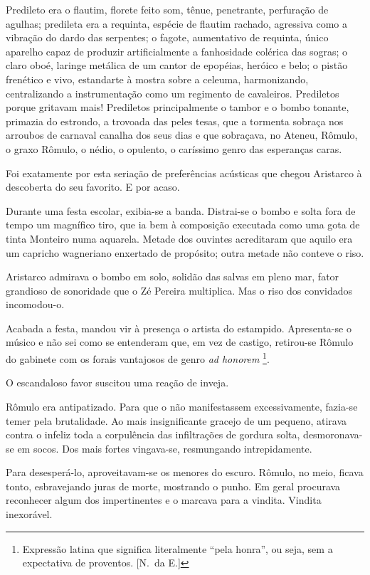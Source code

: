 Predileto era o flautim, florete feito som,
tênue, penetrante, perfuração de agulhas; predileta era a requinta,
espécie de flautim rachado, agressiva como a vibração do dardo das
serpentes; o fagote, aumentativo de requinta, único aparelho capaz de
produzir artificialmente a fanhosidade colérica das sogras; 
o claro oboé, laringe metálica de um cantor de epopéias, heróico
e belo; o pistão frenético e vivo, estandarte à mostra sobre a celeuma,
harmonizando, centralizando a instrumentação como um regimento de
cavaleiros. Prediletos porque gritavam mais! Prediletos principalmente
o tambor e o bombo tonante, primazia do estrondo, a trovoada das peles
tesas, que a tormenta sobraça nos arroubos de carnaval canalha dos seus
dias e que sobraçava, no Ateneu, Rômulo, o graxo Rômulo, o nédio, o
opulento, o caríssimo genro das esperanças caras. 

Foi exatamente por
esta seriação de preferências acústicas que chegou Aristarco à
descoberta do seu favorito. E por acaso. 

Durante uma festa escolar,
exibia{}-se a banda. Distrai{}-se o bombo e solta fora de tempo um
magnífico tiro, que ia bem à composição executada como uma gota de
tinta Monteiro numa aquarela. Metade dos ouvintes acreditaram que
aquilo era um capricho wagneriano enxertado de propósito; outra metade
não conteve o riso. 

Aristarco admirava o bombo em solo, solidão das
salvas em pleno mar, fator grandioso de sonoridade que o Zé Pereira
multiplica. Mas o riso dos convidados incomodou{}-o. 

Acabada a festa,
mandou vir à presença o artista do estampido. Apresenta{}-se o músico e
não sei como se entenderam que, em vez de castigo, retirou{}-se Rômulo
do gabinete com os forais vantajosos de genro \textit{ad honorem}
\footnote{ Expressão latina que significa literalmente ``pela honra'', 
ou seja, sem a expectativa de proventos. [N.~da E.]}. 

O escandaloso favor suscitou uma reação de inveja. 

Rômulo era antipatizado. 
Para que o não manifestassem excessivamente, fazia{}-se temer pela brutalidade.
Ao mais insignificante gracejo de um pequeno, atirava contra o infeliz
toda a corpulência das infiltrações de gordura solta, desmoronava{}-se
em socos. Dos mais fortes vingava{}-se, resmungando intrepidamente.

Para desesperá{}-lo, aproveitavam{}-se os menores do escuro. Rômulo, no
meio, ficava tonto, esbravejando juras de morte, mostrando o punho. Em
geral procurava reconhecer algum dos impertinentes e o marcava para a
vindita. Vindita inexorável. 

